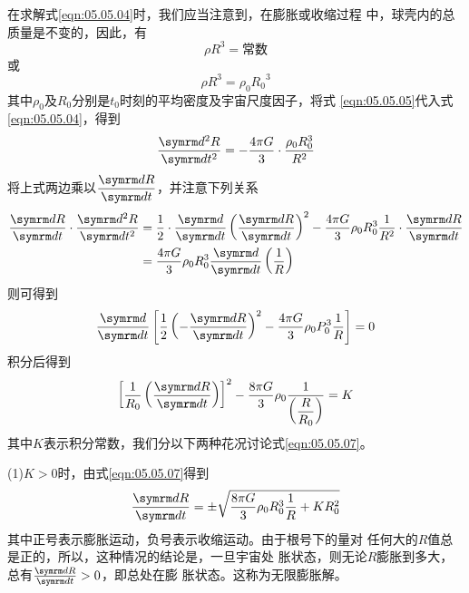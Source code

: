 在求解式\eqref{eqn:05.05.04}时，我们应当注意到，在膨胀或收缩过程
中，球壳内的总质量是不变的，因此，有
\begin{equation*}
 \rho R ^ { 3 } = \text{常数}
\end{equation*}
或\vspace{-0.6em}
\begin{equation}\label{eqn:05.05.05}
 \rho R ^ { 3 } = \rho _ 0 { R _ 0} ^ { 3 }
\end{equation}
其中$ \rho _ { 0 } $及$ R _ 0 $分别是$ t _ { 0 } $时刻的平均密度及宇宙尺度因子，将式
\eqref{eqn:05.05.05}代入式\eqref{eqn:05.05.04}，得到
\begin{equation}\label{eqn:05.05.06}
 \frac { \dif ^ { 2 } R } { \dif t ^ { 2 } } = - \frac { 4 \pi G } { 3 } \cdot \frac { \rho _ { 0 } R _ { 0 } ^ { 3 } } { R ^ { 2 } }
\end{equation}
将上式两边乘以$ \dfrac { \dif R } { \dif t } $，并注意下列关系
\begin{equation*}
 \begin{aligned}
 \frac { \dif R } { \dif t } \cdot \frac { \dif ^ { 2 } R } { \dif t ^ { 2 } }
 &= \frac { 1 } { 2 } \cdot \frac { \dif } { \dif t } \left( \frac { \dif R } { \dif t } \right) ^ { 2 } - \frac { 4 \pi G } { 3 } \rho _ { 0 } R _ { 0 } ^ { 3 } \frac { 1 } { R ^ { 2 } } \cdot \frac { \dif R } { \dif t } \\
 &= \frac { 4 \pi G } { 3 } \rho _ { 0 } R _ 0 ^ { 3 } \frac { \dif } { \dif t } \left( \frac { 1 } { R } \right)
 \end{aligned}
\end{equation*}
则可得到
\begin{equation*}
 \frac { \dif } { \dif t } \left[ \frac { 1 } { 2 } \left( - \frac { \dif R } { \dif t } \right) ^ { 2 } - \frac { 4 \pi G } { 3 } \rho _ { 0 } P _ { 0 } ^ { 3 } \frac { 1 } { R } \right] = 0
\end{equation*}
积分后得到
\begin{equation}\label{eqn:05.05.07}
 \left[ \frac { 1 } { R _ { 0 } } \left( \frac { \dif R } { \dif t } \right) \right] ^ { 2 } - \frac { 8 \pi G } { 3 } \rho _ 0 \frac { 1 } {\left( \dfrac { R } { R _ { 0 } }\right)} = K
\end{equation}
其中$ K $表示积分常数，我们分以下两种花况讨论式\eqref{eqn:05.05.07}。

(1)$ K > 0 $时，由式\eqref{eqn:05.05.07}得到
\begin{equation}\label{eqn:05.05.08}
 \frac { \dif R } { \dif t } = \pm \sqrt { \frac { 8 \pi G } { 3 } \rho _ { 0 } R _ { 0 } ^ { 3 } \frac { 1 } { R } + K R _ 0 ^ { 2 } }
\end{equation}
其中正号表示膨胀运动，负号表示收缩运动。由于根号下的量对
任何大的$ R $值总是正的，所以，这种情况的结论是，一旦宇宙处
胀状态，则无论$ R $膨胀到多大，总有$ \frac { \dif R } { \dif t } > 0 $，即总处在膨
胀状态。这称为无限膨胀解。

